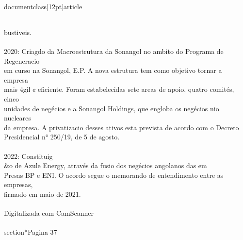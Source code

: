 \\documentclass[12pt]{article}
\begin{document}
{\\
bustiveis.\\
\\
2020: Criagdo da Macroestrutura da Sonangol no ambito do Programa de Regeneracio\\
em curso na Sonangol, E.P. A nova estrutura tem como objetivo tornar a empresa\\
mais 4gil ¢ eficiente. Foram estabelecidas sete areas de apoio, quatro comités, cinco\\
unidades de negécios e a Sonangol Holdings, que engloba os negécios nio nucleares\\
da empresa. A privatizacio desses ativos esta prevista de acordo com o Decreto\\
Presidencial n° 250/19, de 5 de agosto.\\
\\
2022: Constituig\\&o de Azule Energy, através da fusio dos negécios angolanos das em\\
Presas BP e ENI. O acordo segue o memorando de entendimento entre as empresas,\\
firmado em maio de 2021.\\
\\
Digitalizada com CamScanner\\

\\section*{Pagina 37}

}
\end{document}
